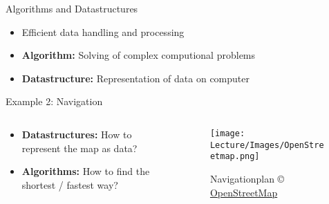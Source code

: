 
\begin{frame}{Algorithms and Datastructures}
  \begin{itemize}
    \item
      Efficient data handling and processing
    \item
      \textbf{Algorithm:} Solving of complex computional problems
    \item
      \textbf{Datastructure:} Representation of data on computer
  \end{itemize}
\end{frame}




\begin{frame}{Example 2: Navigation}
  \begin{columns}
    \begin{column}{0.575\textwidth}
      \begin{itemize}
        \item
          \textbf{Datastructures:} How to represent the map as data?
        \item
          \textbf{Algorithms:} How to find the shortest / fastest way?
      \end{itemize}
    \end{column}%
    \begin{column}{0.425\textwidth}
      \begin{figure}
        \texttt{[image: Lecture/Images/OpenStreetmap.png]}
        \caption{Navigationplan \copyright\,%
          \href{http://openstreetmap.org/}{OpenStreetMap}%
        }%
        \label{fig:openstreetmap}
      \end{figure}
    \end{column}
  \end{columns}
\end{frame}